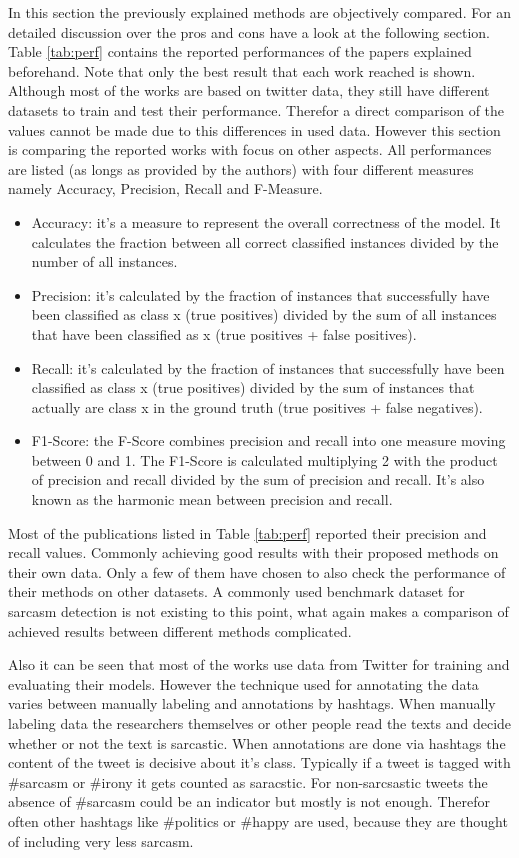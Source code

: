 \documentclass[sigconf,  review=false, nonacm=true]{acmart}
\begin{document}
In this section the previously explained methods are objectively compared. For an detailed discussion over the pros and cons have a look at the following section. Table \ref{tab:perf} contains the reported performances of the papers explained beforehand. Note that only the best result that each work reached is shown. Although most of the works are based on twitter data, they still have different datasets to train and test their performance. Therefor a direct comparison of the values cannot be made due to this differences in used data. However this section is comparing the reported works with focus on other aspects.
All performances are listed (as longs as provided by the authors) with four different measures namely Accuracy, Precision, Recall and F-Measure.

\begin{itemize} 
	\item Accuracy: it's a measure to represent the overall correctness of the model. It calculates the fraction between all correct classified instances divided by the number of all instances.
	\item Precision: it's calculated by the fraction of instances that successfully have been classified as class x (true positives) divided by the sum of all instances that have been classified as x (true positives + false positives).
	\item Recall: it's calculated by the fraction of instances that successfully have been classified as class x (true positives) divided by the sum of instances that actually are class x in the ground truth (true positives + false negatives).
	\item F1-Score: the F-Score combines precision and recall into one measure moving between 0 and 1. The F1-Score is calculated multiplying 2 with the product of precision and recall divided by the sum of precision and recall. It's also known as the harmonic mean between precision and recall.
\end{itemize}

Most of the publications listed in Table \ref{tab:perf} reported their precision and recall values. Commonly achieving good results with their proposed methods on their own data. Only a few of them have chosen to also check the performance of their methods on other datasets. A commonly used benchmark dataset for sarcasm detection is not existing to this point, what again makes a comparison of achieved results between different methods complicated.

Also it can be seen that most of the works use data from Twitter for training and evaluating their models. However the technique used for annotating the data varies between manually labeling and annotations by hashtags. When manually labeling data the researchers themselves or other people read the texts and decide whether or not the text is sarcastic. When annotations are done via hashtags the content of the tweet is decisive about it's class. Typically if a tweet is tagged with \#sarcasm or \#irony it gets counted as saracstic. For non-sarcsastic tweets the absence of \#sarcasm could be an indicator but mostly is not enough. Therefor often other hashtags like \#politics or \#happy are used, because they are thought of including very less sarcasm.
 
\end{document}
